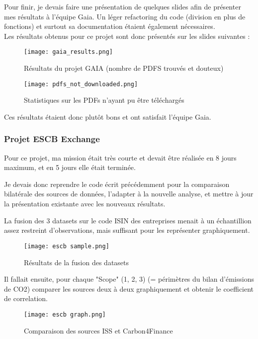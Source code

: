Pour finir, je devais faire une présentation de quelques slides afin de présenter mes résultats à l'équipe Gaia.
Un léger refactoring du code (division en plus de fonctions) et surtout sa documentation étaient également nécessaires. 
\\
Les résultats obtenus pour ce projet sont donc présentés sur les slides suivantes :

\begin{figure}[H]
    \centering
    \texttt{[image: gaia\_results.png]}
    \caption{Résultats du projet GAIA (nombre de PDFS trouvés et douteux)}
\end{figure}

\begin{figure}[H]
    \centering
    \texttt{[image: pdfs\_not\_downloaded.png]}
    \caption{Statistiques sur les PDFs n'ayant pu être téléchargés}
\end{figure}

Ces résultats étaient donc plutôt bons et ont satisfait l'équipe Gaia.

\pagebreak

\subsubsection{Projet ESCB Exchange}

Pour ce projet, ma mission était très courte et devait être réalisée en 8 jours maximum, et en 5 jours elle était terminée. 

Je devais donc reprendre le code écrit précédemment pour la comparaison bilatérale des sources de données, l'adapter à la nouvelle analyse, et mettre à jour la présentation existante avec les nouveaux résultats.

La fusion des 3 datasets sur le code ISIN des entreprises menait à un échantillion assez restreint d'observations, mais suffisant pour les représenter graphiquement.

\begin{figure}[H]
    \centering
    \texttt{[image: escb sample.png]}
    \caption{Résultats de la fusion des datasets}
\end{figure}

Il fallait ensuite, pour chaque "Scope" (1, 2, 3) (= périmètres du bilan d'émissions de CO2) comparer les sources deux à deux graphiquement et obtenir le coefficient de correlation.

\begin{figure}[H]
    \centering
    \texttt{[image: escb graph.png]}
    \caption{Comparaison des sources ISS et Carbon4Finance}
\end{figure}

